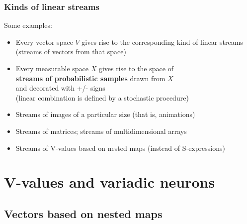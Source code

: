 \documentclass{beamer}
\newcommand{\msmagenta}[1]{{\color{mymagenta} #1}}
\begin{document}
\begin{frame}

\frametitle{Kinds of linear streams}

 Some examples:\\[1ex]


\begin{itemize}


\item Every vector space $V$ gives rise to the corresponding kind of linear streams
(streams of vectors from that space)\\[2ex]

\item \msmagenta{Every measurable space $X$ gives rise to the space of\\ {\bf streams of
probabilistic samples} drawn from $X$\\ and decorated with +/- signs\\
(linear combination is defined by a stochastic procedure)}\\[2ex]

\item Streams of images of a particular size (that is, animations)\\[2ex]

\item Streams of matrices; streams of multidimensional arrays\\[2ex]

\item \msmagenta{Streams of V-values based on nested maps (instead of S-expressions)}\\[2ex]



\end{itemize}

\end{frame}












\section{V-values and variadic neurons}







\subsection{Vectors based on nested maps}
\end{document}
